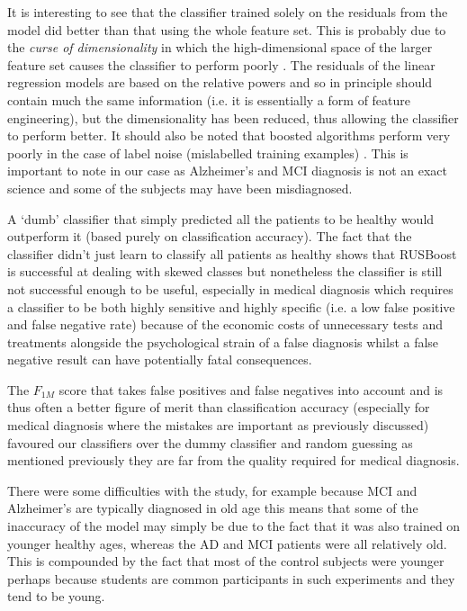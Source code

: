 It is interesting to see that the classifier trained solely on the residuals from the model did better than that using the whole feature set. This is probably due to the \textit{curse of dimensionality} in which the high-dimensional space of the larger feature set causes the classifier to perform poorly \cite{Witten2011}. The residuals of the linear regression models are based on the relative powers and so in principle should contain much the same information (i.e. it is essentially a form of feature engineering), but the dimensionality has been reduced, thus allowing the classifier to perform better. It should also be noted that boosted algorithms perform very poorly in the case of label noise (mislabelled training examples) \cite{Long2009}. This is important to note in our case as Alzheimer's and MCI diagnosis is not an exact science and some of the subjects may have been misdiagnosed.

A `dumb' classifier that simply predicted all the patients to be healthy would outperform it (based purely on classification accuracy). The fact that the classifier didn't just learn to classify all patients as healthy shows that RUSBoost is successful at dealing with skewed classes but nonetheless the classifier is still not successful enough to be useful, especially in medical diagnosis which requires a classifier to be both highly sensitive and highly specific (i.e. a low false positive and false negative rate) because of the economic costs of unnecessary tests and treatments alongside the psychological strain of a false diagnosis whilst a false negative result can have potentially fatal consequences.

The $F_{1M}$ score that takes false positives and false negatives into account and is thus often a better figure of merit than classification accuracy (especially for medical diagnosis where the mistakes are important as previously discussed) favoured our classifiers over the dummy classifier and random guessing as mentioned previously they are far from the quality required for medical diagnosis.

There were some difficulties with the study, for example because MCI and Alzheimer's are typically diagnosed in old age this means that some of the inaccuracy of the model may simply be due to the fact that it was also trained on younger healthy ages, whereas the AD and MCI patients were all relatively old. This is compounded by the fact that most of the control subjects were younger perhaps because students are common participants in such experiments and they tend to be young.

